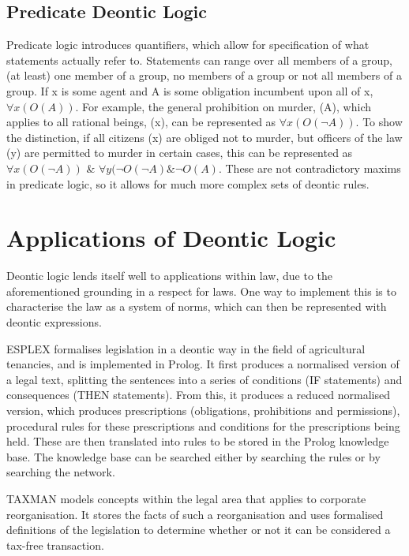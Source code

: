 \documentclass{l4proj}
\begin{document}
\subsection{Predicate Deontic Logic}
Predicate logic\cite{predicate} introduces quantifiers, which allow for specification of what statements actually refer to. Statements can range over all members of a group, (at least) one member of a group, no members of a group or not all members of a group. If x is some agent and A is some obligation incumbent upon all of x, \( \forall{x(O(A))} \). For example, the general prohibition on murder, (A), which applies to all rational beings, (x), can be represented as \( \forall{x(O( \neg A))} \). To show the distinction, if all citizens (x) are obliged not to murder, but officers of the law (y) are permitted to murder in certain cases, this can be represented as \( \forall{x(O( \neg A))} \) \& \( \forall{y( \neg O( \neg A) \& \neg O(A)} \). These are not contradictory maxims in predicate logic, so it allows for much more complex sets of deontic rules. 

\section{Applications of Deontic Logic}
Deontic logic lends itself well to applications within law, due to the aforementioned grounding in a respect for laws. One way to implement this is to characterise the law as a system of norms\cite{law-jonessergot}, which can then be represented with deontic expressions. 

ESPLEX formalises legislation in a deontic way in the field of agricultural tenancies\cite{ESPLEX}, and is implemented in Prolog. It first produces a normalised version of a legal text, splitting the sentences into a series of conditions (IF statements) and consequences (THEN statements). From this, it produces a reduced normalised version, which produces prescriptions (obligations, prohibitions and permissions), procedural rules for these prescriptions and conditions for the prescriptions being held. These are then translated into rules to be stored in the Prolog knowledge base. The knowledge base can be searched either by searching the rules or by searching the network.

TAXMAN models concepts within the legal area that applies to corporate reorganisation\cite{TAXMAN}. It stores the facts of such a reorganisation and uses formalised definitions of the legislation to determine whether or not it can be considered a tax-free transaction. 
\end{document}
